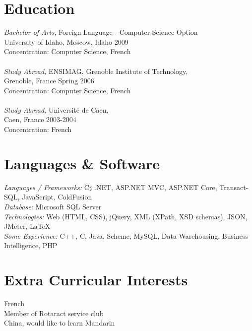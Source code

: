 \documentclass[line,margin]{res}
\begin{document}
\begin{resume}
 
\section{Education} {\sl Bachelor of Arts,} Foreign Language - Computer Science Option\\
                University of Idaho, Moscow, Idaho
                2009 \\
                Concentration: Computer Science, French\\
		\\
		{\sl Study Abroad,} 
		ENSIMAG, Grenoble Institute of Technology, \\ Grenoble, France 
		Spring 2006 \\
		Concentration: Computer Science, French \\
		\\
		{\sl Study Abroad,} 
		Universit\'{e} de Caen, \\ Caen, France 
		2003-2004 \\
		Concentration: French
		
 
 
\section{Languages \& Software} {\sl Languages / Frameworks:} C\ensuremath{\sharp}  .NET, ASP.NET MVC, ASP.NET Core, Transact-SQL, JavaScript, ColdFusion \\
				{\sl Database:} Microsoft SQL Server \\
				{\sl Technologies:} Web (HTML, CSS), jQuery, XML (XPath, XSD schemas), JSON, JMeter, \LaTeX \\
				{\sl Some Experience:} C++, C, Java, Scheme, MySQL, Data Warehousing, Business Intelligence, PHP \\ 

\section{Extra Curricular Interests}             
	    French \\
	    Member of Rotaract service club \\
	    China, would like to learn Mandarin \\ 

\end{resume}
\end{document}
